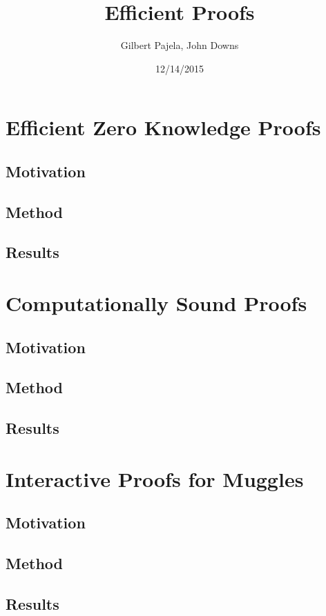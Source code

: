 \documentclass{article}
\title{Efficient Proofs}
\author{Gilbert Pajela, John Downs}
\date{12/14/2015}
\begin{document}
\maketitle

\section{Efficient Zero Knowledge Proofs}

\subsection{Motivation}
\subsection{Method}
\subsection{Results}

\section{Computationally Sound Proofs}

\subsection{Motivation}
\subsection{Method}
\subsection{Results}


\section{Interactive Proofs for Muggles}

\subsection{Motivation}
\subsection{Method}
\subsection{Results}
\end{document}
